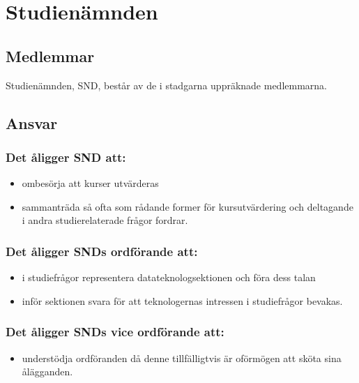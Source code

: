 \section{Studienämnden}
\subsection{Medlemmar}
Studienämnden, SND, består av de i stadgarna uppräknade medlemmarna.

\subsection{Ansvar}

\subsubsection{Det åligger SND att:}
\begin{itemize}
  \item ombesörja att kurser utvärderas
  \item sammanträda så ofta som rådande former för kursutvärdering och
    deltagande i andra studierelaterade frågor fordrar.
\end{itemize}

\subsubsection{Det åligger SNDs ordförande att:}
\begin{itemize}
  \item i studiefrågor representera datateknologsektionen och föra dess talan
  \item inför sektionen svara för att teknologernas intressen i studiefrågor bevakas.
\end{itemize}

\subsubsection{Det åligger SNDs vice ordförande att:}
\begin{itemize}
\item understödja ordföranden då denne tillfälligtvis är oförmögen att
  sköta sina ålägganden.
\end{itemize}
\newpage

